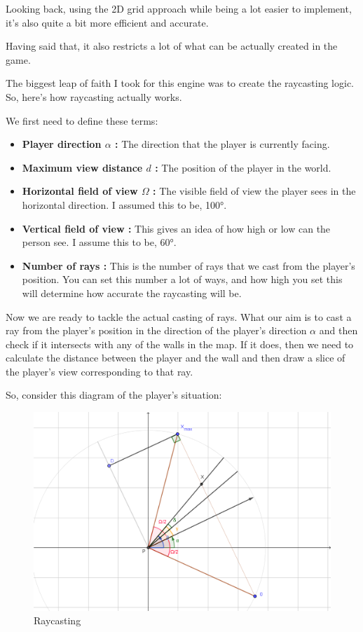 Looking back, using the 2D grid approach while being a lot easier to implement, it's also quite a bit more efficient and accurate.

Having said that, it also restricts a lot of what can be actually created in the game.


The biggest leap of faith I took for this engine was to create the raycasting logic. So, here's how raycasting actually works.

We first need to define these terms:

\begin{itemize}

    \item \textbf{Player direction $\alpha$ :} The direction that the player is currently facing.
    \item \textbf{Maximum view distance $d$ :} The position of the player in the world.
    \item \textbf{Horizontal field of view $\Omega$ :} The visible field of view the player sees in the horizontal direction. I assumed this to be, 100°.
    \item \textbf{Vertical field of view :} This gives an idea of how high or low can the person see. I assume this to be, 60°.
    \item \textbf{Number of rays :} This is the number of rays that we cast from the player's position. You can set this number a lot of ways, and how high you set this will determine how accurate the raycasting will be.

\end{itemize}

\pagebreak

Now we are ready to tackle the actual casting of rays. What our aim is to cast a ray from the player's position in the direction of the player's direction $\alpha$ and then check if it intersects with any of the walls in the map. If it does, then we need to calculate the distance between the player and the wall and then draw a slice of the player's view corresponding to that ray.

So, consider this diagram of the player's situation:

\begin{figure}[!ht]
    \centering
    \includegraphics[width=\textwidth]{./images/raycasting.png}
    \caption{Raycasting}
    \label{fig:rays}
\end{figure}

